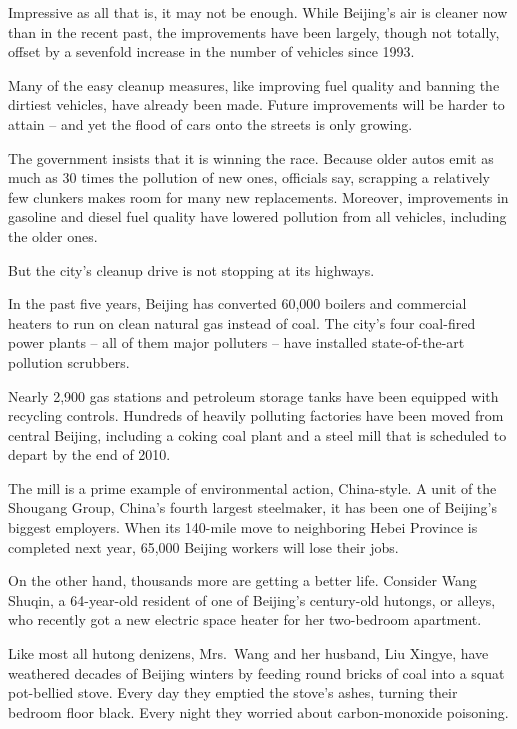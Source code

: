 ﻿\documentclass[12pt]{article}
\begin{document}
Impressive as all that is, it may not be enough. While Beijing's air is cleaner now than in the
recent past, the improvements have been largely, though not totally, offset by a sevenfold increase
in the number of vehicles since 1993.

Many of the easy cleanup measures, like improving fuel quality and banning the dirtiest vehicles,
have already been made. Future improvements will be harder to attain -- and yet the flood of cars
onto the streets is only growing.

The government insists that it is winning the race. Because older autos emit as much as 30 times the
pollution of new ones, officials say, scrapping a relatively few clunkers makes room for many new
replacements. Moreover, improvements in gasoline and diesel fuel quality have lowered pollution from
all vehicles, including the older ones.

But the city's cleanup drive is not stopping at its highways.

In the past five years, Beijing has converted 60,000 boilers and commercial heaters to run on clean
natural gas instead of coal. The city's four coal-fired power plants -- all of them major polluters
-- have installed state-of-the-art pollution scrubbers.

Nearly 2,900 gas stations and petroleum storage tanks have been equipped with recycling controls.
Hundreds of heavily polluting factories have been moved from central Beijing, including a coking
coal plant and a steel mill that is scheduled to depart by the end of 2010.

The mill is a prime example of environmental action, China-style. A unit of the Shougang Group,
China's fourth largest steelmaker, it has been one of Beijing's biggest employers. When its 140-mile
move to neighboring Hebei Province is completed next year, 65,000 Beijing workers will lose their
jobs.

On the other hand, thousands more are getting a better life. Consider Wang Shuqin, a 64-year-old
resident of one of Beijing's century-old hutongs, or alleys, who recently got a new electric space
heater for her two-bedroom apartment.

Like most all hutong denizens, Mrs.~Wang and her husband, Liu Xingye, have weathered decades of
Beijing winters by feeding round bricks of coal into a squat pot-bellied stove. Every day they
emptied the stove's ashes, turning their bedroom floor black. Every night they worried about
carbon-monoxide poisoning.
\end{document}
